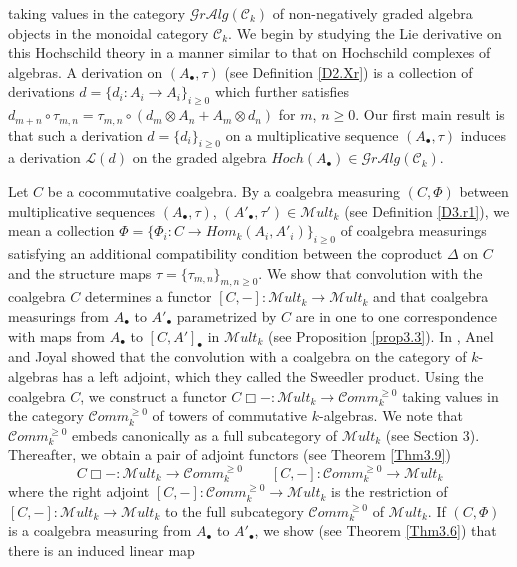 \documentclass[10pt, colorlinks]{article}
\numberwithin{equation}{section} \DeclareMathSizes{2}{10}{12}{13}
\begin{document}
taking values in the category $\mathscr Gr\mathcal Alg(\mathcal C_k) $ of non-negatively graded algebra objects in the monoidal category $\mathcal C_k$. We begin by studying the Lie derivative on this Hochschild theory in a manner similar to that on Hochschild complexes of algebras. A derivation on $(A_\bullet,\tau)$ (see Definition \ref{D2.Xr}) is a collection of derivations
$d=\{d_i:A_i\longrightarrow A_i\}_{i\geq 0}$ which further satisfies  $
            d_{m+n}\circ\tau_{m,n}=\tau_{m,n}\circ (d_{m}\otimes A_n+A_m\otimes d_n)$ for $m$, $n\geq 0$. Our first main result is that such a derivation $d=\{d_i\}_{i\geq 0}$ on a multiplicative sequence $(A_\bullet,\tau)$ induces a derivation $\mathscr{L}(d)$  on the graded algebra $Hoch(A_\bullet)\in   \mathscr Gr\mathcal Alg(\mathcal C_k)$.
            
            \smallskip
            Let $C$ be a cocommutative coalgebra. By a coalgebra measuring $(C,\Phi)$ between multiplicative sequences $(A_\bullet,\tau)$, $(A'_\bullet,\tau')\in \mathscr Mult_k$ (see Definition \ref{D3.r1}), we mean a collection $\Phi=\{\Phi_i: C\longrightarrow  {Hom}_k(A_i,A'_i)\}_{i\geq 0}$ of coalgebra measurings satisfying an additional compatibility condition between the coproduct $\Delta$ on $C$ and the structure maps $\tau=\{\tau_{m,n}\}_{m,n\geq 0}$. We show that convolution with the coalgebra $C$ determines a functor $[C,-]:\mathscr Mult_k\longrightarrow \mathscr Mult_k$  and that coalgebra measurings from $A_\bullet$ to $A'_\bullet$ parametrized by $C$ are in one to one correspondence with maps from 
            $A_\bullet$ to $[C,A']_\bullet$ in $\mathscr Mult_k$ (see Proposition \ref{prop3.3}). In \cite{AJ}, Anel and Joyal showed that the convolution with a coalgebra on the category of $k$-algebras has a left adjoint, which they called the Sweedler product. Using the coalgebra $C$, we construct a functor
           $
C\Box-:\mathscr Mult_k\longrightarrow \mathcal Comm^{\geq 0}_k$  taking values in the category $\mathcal Comm^{\geq 0}_k$ of towers of commutative $k$-algebras. We note that $\mathcal Comm^{\geq 0}_k$ embeds canonically as  a full subcategory of $\mathscr Mult_k$ (see Section 3). Thereafter, we obtain a pair of adjoint functors (see Theorem \ref{Thm3.9})
            \begin{equation}\label{1.3}
            C\Box-:\mathscr Mult_k\longrightarrow \mathcal Comm^{\geq 0}_k\qquad [C,-]: \mathcal Comm^{\geq 0}_k\longrightarrow \mathscr Mult_k
            \end{equation} where the right adjoint $[C,-]: \mathcal Comm^{\geq 0}_k\longrightarrow \mathscr Mult_k$ is the restriction of $[C,-]:\mathscr Mult_k\longrightarrow \mathscr Mult_k$  to the full subcategory $\mathcal Comm^{\geq 0}_k$  of $\mathscr Mult_k$. If $(C,\Phi)$ is a coalgebra measuring from $A_\bullet$ to $A'_\bullet$, we show (see Theorem \ref{Thm3.6}) that there is an induced linear map
\end{document}
